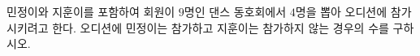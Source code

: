 \hspace*{2mm}\begin{minipage}[t]{\dimexpr\linewidth-2mm\relax}\vspace{0pt}
민정이와 지훈이를 포함하여 회원이 $9$명인 댄스 동호회에서 $4$명을 뽑아 오디션에 참가시키려고 한다. 오디션에 민정이는 참가하고 지훈이는 참가하지 않는 경우의 수를 구하시오.\end{minipage}
